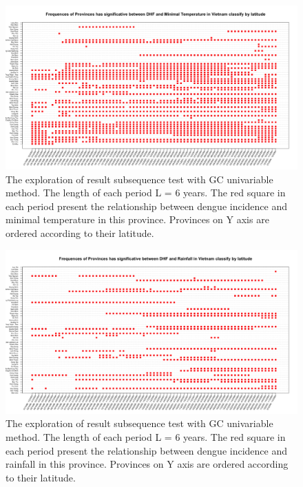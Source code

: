 \begin{figure}[h]
\begin{center}
\includegraphics[width = \linewidth]{../figures/annexe/lat_result_tm.png}
\caption{The exploration of result subsequence test with GC univariable method. The length of each period L = 6 years. The red square in each period present the relationship between dengue incidence and minimal temperature in this province. Provinces on Y axis are ordered according to their latitude.  }
\label{expl_10}	
\end{center}
\end{figure}

\begin{figure}[h]
\begin{center}
\includegraphics[width = \linewidth]{../figures/annexe/lat_result_rf.png}
\caption{The exploration of result subsequence test with GC univariable method. The length of each period L = 6 years. The red square in each period present the relationship between dengue incidence and rainfall in this province. Provinces on Y axis are ordered according to their latitude.  }
\label{expl_11}	
\end{center}
\end{figure}

